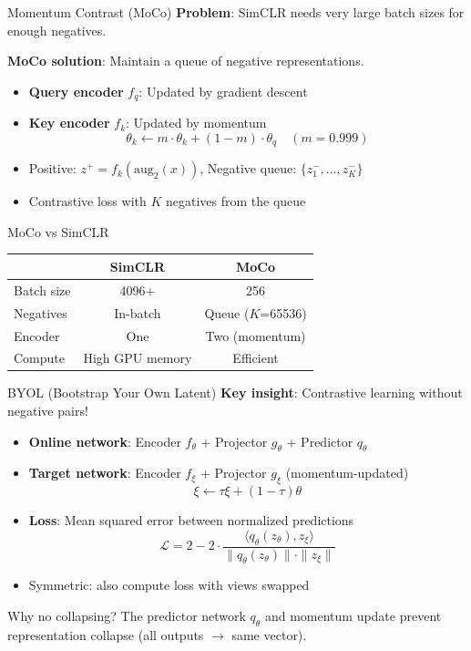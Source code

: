 \documentclass[11pt]{beamer}
\begin{document}
\begin{frame}{Momentum Contrast (MoCo)}
    \textbf{Problem}: SimCLR needs very large batch sizes for enough negatives.
    \vspace{0.5em}

    \textbf{MoCo solution}: Maintain a queue of negative representations.
    \begin{itemize}
        \item \textbf{Query encoder} $f_q$: Updated by gradient descent
        \item \textbf{Key encoder} $f_k$: Updated by momentum
            \[
                \theta_k \leftarrow m \cdot \theta_k + (1-m) \cdot \theta_q \quad (m = 0.999)
            \]
        \item Positive: $z^+ = f_k(\text{aug}_2(x))$, Negative queue: $\{z^-_1, \ldots, z^-_K\}$
        \item Contrastive loss with $K$ negatives from the queue
    \end{itemize}
    \vfill
    \begin{block}{MoCo vs SimCLR}
        \begin{tabular}{lcc}
            \toprule
            & SimCLR & MoCo \\
            \midrule
            Batch size & 4096+ & 256 \\
            Negatives & In-batch & Queue ($K$=65536) \\
            Encoder & One & Two (momentum) \\
            Compute & High GPU memory & Efficient \\
            \bottomrule
        \end{tabular}
    \end{block}
\end{frame}

\begin{frame}{BYOL (Bootstrap Your Own Latent)}
    \textbf{Key insight}: Contrastive learning without negative pairs!
    \vspace{0.5em}
    \begin{itemize}
        \item \textbf{Online network}: Encoder $f_\theta$ + Projector $g_\theta$ + Predictor $q_\theta$
        \item \textbf{Target network}: Encoder $f_\xi$ + Projector $g_\xi$ (momentum-updated)
            \[
                \xi \leftarrow \tau \xi + (1-\tau)\theta
            \]
        \item \textbf{Loss}: Mean squared error between normalized predictions
            \[
                \mathcal{L} = 2 - 2 \cdot \frac{\langle q_\theta(z_\theta), z_\xi \rangle}{\|q_\theta(z_\theta)\| \cdot \|z_\xi\|}
            \]
        \item Symmetric: also compute loss with views swapped
    \end{itemize}
    \vfill
    \begin{alertblock}{Why no collapsing?}
        The predictor network $q_\theta$ and momentum update prevent representation collapse (all outputs $\to$ same vector).
    \end{alertblock}
\end{frame}
\end{document}
